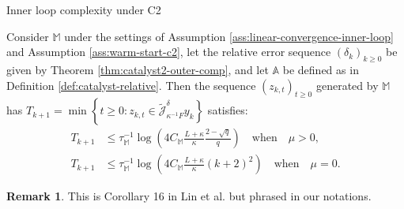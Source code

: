 \documentclass[11pt]{beamer}
\theoremstyle{definition}
\newtheorem{remark}{Remark}[section]
\begin{document}
        \begin{frame}{Inner loop complexity under C2}
            \begin{theorem}\label{thm:inner-loop-comp-c2}
                Consider $\mathbb M$ under the settings of Assumption \ref{ass:linear-convergence-inner-loop} and Assumption \ref{ass:warm-start-c2}, let the relative error sequence $(\delta_k)_{k \ge0}$ be given by Theorem \ref{thm:catalyst2-outer-comp}, and let $\mathbb A$ be defined as in Definition \ref{def:catalyst-relative}. 
                Then the sequence $(z_{k, t})_{t \ge 0}$ generated by $\mathbb M$ has $T_{k + 1} = \min\left\lbrace t \ge 0 : z_{k, t} \in \widetilde{\mathcal J}_{\kappa^{-1}F}^\delta y_k\right\rbrace$ satisfies: 
                \begin{align*}
                    T_{k + 1} &\le \tau_{\mathbb M}^{-1}
                    \log\left(
                        4 C_{\mathbb M}\frac{L + \kappa}{\kappa}\frac{2 - \sqrt{q}}{q}
                    \right) \quad \text{when}\quad \mu > 0, 
                    \\
                    T_{k + 1} &\le \tau_{\mathbb M}^{-1}
                    \log\left(
                        4 C_{\mathbb M}\frac{L + \kappa}{\kappa}(k + 2)^2
                    \right) \quad \text{when}\quad \mu = 0.  
                \end{align*}
            \end{theorem}
            \begin{remark}
                This is Corollary 16 in Lin et al. \cite{lin_catalyst_2018} but phrased in our notations. 
            \end{remark}
        \end{frame}
\end{document}
